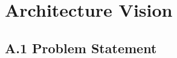 \newpage\sloppy
\setlength{\RaggedRightRightskip}{0pt plus 2em}
\section{Architecture Vision}

\subsection{A.1 Problem Statement}

\fussy
